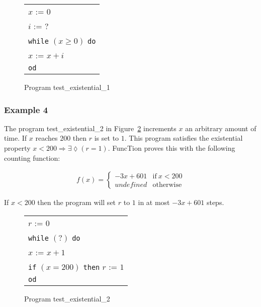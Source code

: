 \documentclass[11pt,a4paper,titlepage]{article}
\theoremstyle{definition}
\begin{document}
\begin{figure}
    \begin{center}
        \begin{tabular}{l}
            $x$ := $0$ \\
            $i$ := $?$ \\
            \texttt{while} $(x \geq 0)$ \texttt{do} \\
            \hspace{1em}$x$ := $x + i$ \\
            \texttt{od}
        \end{tabular}
    \end{center}
    \vspace{-1em}
    \caption{Program \textsf{test\_existential\_1}}
    \label{fig:test_existential_1}
\end{figure}

\subsubsection*{Example 4}
The program \textsf{test\_existential\_2} in Figure~\ref{fig:test_existential_2} increments $x$ an arbitrary amount of time. If $x$ reaches $200$ then $r$
is set to $1$. This program satisfies the existential property $x < 200 \Rightarrow \exists\lozenge(r = 1)$. FuncTion
proves this with the following counting function:

\begin{align*}
f(x) = \begin{cases}
    -3x + 601  & \text{if} \ x < 200 \\
    undefined  & \text{otherwise}
\end{cases}
\end{align*}

If $x < 200$ then the program will set $r$ to $1$ in at most $-3x + 601$ steps.



\begin{figure}
    \begin{center}
        \begin{tabular}{l}
            $r$ := $0$ \\
            \texttt{while} $(?)$ \texttt{do} \\
            \hspace{1em}$x$ := $x + 1$ \\
            \hspace{1em}\texttt{if} $(x = 200)$ \texttt{then} $r$ := $1$ \\
            \texttt{od}
        \end{tabular}
    \end{center}
    \vspace{-1em}
    \caption{Program \textsf{test\_existential\_2}}
    \label{fig:test_existential_2}
\end{figure}
\end{document}
